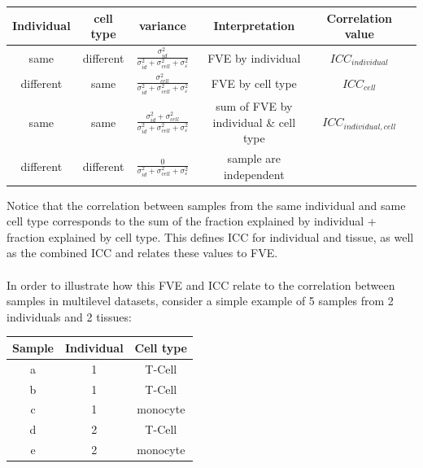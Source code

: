\documentclass[12pt]{article}\usepackage[]{graphicx}\usepackage[]{xcolor}
\begin{document}
\renewcommand{\arraystretch}{1.8}
\begin{center}
  \begin{tabular}{cccccc}
    \hline
    Individual & cell type & variance & Interpretation & Correlation value\\
    \hline
     same & different &  $\frac{\sigma^2_{id}}{\sigma^2_{id} + \sigma^2_{cell} + \sigma^2_\varepsilon }$ & FVE by individual & $ICC_{individual}$\\%
    different & same & $\frac{\sigma^2_{cell}}{\sigma^2_{id} + \sigma^2_{cell} + \sigma^2_\varepsilon }$ & FVE by cell type & $ICC_{cell}$\\%
    same & same & $\frac{\sigma^2_{id} + \sigma^2_{cell}}{\sigma^2_{id} + \sigma^2_{cell} + \sigma^2_\varepsilon }$ & sum of FVE by individual \& cell type & $ICC_{individual,cell}$\\ %
    different & different & $\frac{0}{\sigma^2_{id} + \sigma^2_{cell} + \sigma^2_\varepsilon }$ &  sample are independent  \\%
    \hline
  \end{tabular}
\end{center}

Notice that the correlation between samples from the same individual and same cell type corresponds to the sum of the fraction explained by individual + fraction explained by cell type.  This defines ICC for individual and tissue, as well as the combined ICC and relates these values to FVE.\\
\\
In order to illustrate how this FVE and ICC relate to the correlation between samples in multilevel datasets, consider a simple example of 5 samples from 2 individuals and 2 tissues:

\begin{center}
  \begin{tabular}{|c|c|c|}
    \hline
    Sample & Individual & Cell type \\
    \hline
    a & 1 & T-Cell \\
    b & 1 & T-Cell \\
    c & 1 & monocyte \\
    d & 2 & T-Cell \\
    e & 2 & monocyte\\
    \hline
  \end{tabular}
\end{center} 
\end{document}
